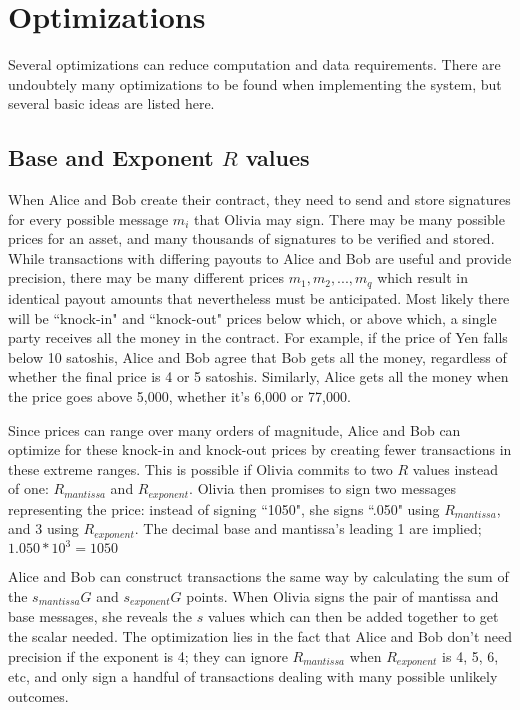 \documentclass[11pt]{article}
\begin{document}
\section*{Optimizations}

Several optimizations can reduce computation and data requirements.  There are undoubtely many optimizations to be found when implementing the system, but several basic ideas are listed here.

\subsection*{Base and Exponent \(R\) values}

When Alice and Bob create their contract, they need to send and store signatures for every possible message \(m_i\) that Olivia may sign.  There may be many possible prices for an asset, and many thousands of signatures to be verified and stored.  While transactions with differing payouts to Alice and Bob are useful and provide precision, there may be many different prices \(m_1,m_2,...,m_q\) which result in identical payout amounts that nevertheless must be anticipated.  Most likely there will be ``knock-in" and ``knock-out" prices below which, or above which, a single party receives all the money in the contract.  For example, if the price of Yen falls below 10 satoshis, Alice and Bob agree that Bob gets all the money, regardless of whether the final price is 4 or 5 satoshis.  Similarly, Alice gets all the money when the price goes above 5,000, whether it's 6,000 or 77,000.  

Since prices can range over many orders of magnitude, Alice and Bob can optimize for these knock-in and knock-out prices by creating fewer transactions in these extreme ranges.  This is possible if Olivia commits to two \(R\) values instead of one: \(R_{mantissa}\) and \(R_{exponent}\).  Olivia then promises to sign two messages representing the price: instead of signing ``1050", she signs ``.050" using  \(R_{mantissa}\), and \(3\) using \(R_{exponent}\).  The decimal base and mantissa's leading 1 are implied; \(1.050 * 10^3 = 1050\)


Alice and Bob can construct transactions the same way by calculating the sum of the \(s_{mantissa}G\) and \(s_{exponent}G\) points.  When Olivia signs the pair of mantissa and base messages, she reveals the \(s\) values which can then be added together to get the scalar needed.
The optimization lies in the fact that Alice and Bob don't need precision if the exponent is 4; they can ignore  \(R_{mantissa}\) when \(R_{exponent}\) is 4, 5, 6, etc, and only sign a handful of transactions dealing with many possible unlikely outcomes.
\end{document}
